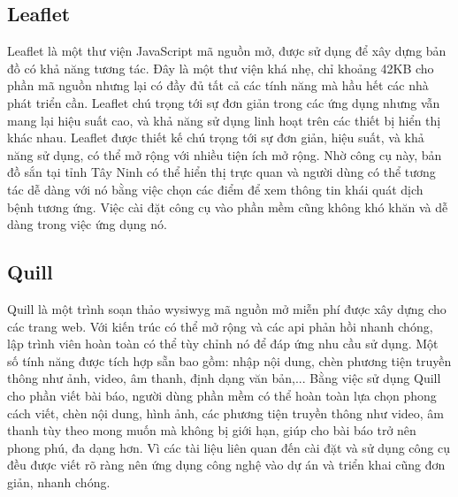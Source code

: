 \documentclass[./../main.tex]{subfiles}
\begin{document}
\subsection{Leaflet}
Leaflet \cite{leaflet} là một thư viện JavaScript mã nguồn mở, được sử dụng để xây dựng bản đồ có khả năng tương tác. Đây là một thư viện khá nhẹ, chỉ khoảng 42KB cho phần mã nguồn nhưng lại có đầy đủ tất cả các tính năng mà hầu hết các nhà phát triển cần. Leaflet chú trọng tới sự đơn giản trong các ứng dụng nhưng vẫn mang lại hiệu suất cao, và khả năng sử dụng linh hoạt trên các thiết bị hiển thị khác nhau. Leaflet được thiết kế chú trọng tới sự đơn giản, hiệu suất, và khả năng sử dụng, có thể mở rộng với nhiều tiện ích mở rộng. Nhờ công cụ này, bản đồ sắn tại tỉnh Tây Ninh có thể hiển thị trực quan và người dùng có thể tương tác dễ dàng với nó bằng việc chọn các điểm để xem thông tin khái quát dịch bệnh tương ứng. Việc cài đặt công cụ vào phần mềm cũng không khó khăn và dễ dàng trong việc ứng dụng nó.

\subsection{Quill}
Quill \cite{quill} là một trình soạn thảo \acrshort{wysiwyg} mã nguồn mở miễn phí được xây dựng cho các trang web. Với kiến trúc có thể mở rộng và các \acrshort{api} phản hồi nhanh chóng, lập trình viên hoàn toàn có thể tùy chỉnh nó để đáp ứng nhu cầu sử dụng. Một số tính năng được tích hợp sẵn bao gồm: nhập nội dung, chèn phương tiện truyền thông như ảnh, video, âm thanh, định dạng văn bản,... Bằng việc sử dụng Quill cho phần viết bài báo, người dùng phần mềm có thể hoàn toàn lựa chọn phong cách viết, chèn nội dung, hình ảnh, các phương tiện truyền thông như video, âm thanh tùy theo mong muốn mà không bị giới hạn, giúp cho bài báo trở nên phong phú, đa dạng hơn. Vì các tài liệu liên quan đến cài đặt và sử dụng công cụ đều được viết rõ ràng nên ứng dụng công nghệ vào dự án và triển khai cũng đơn giản, nhanh chóng.
\end{document}
